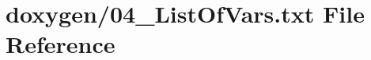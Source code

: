 \hypertarget{04__ListOfVars_8txt}{\section{doxygen/04\+\_\+\+List\+Of\+Vars.txt File Reference}
\label{04__ListOfVars_8txt}
}

